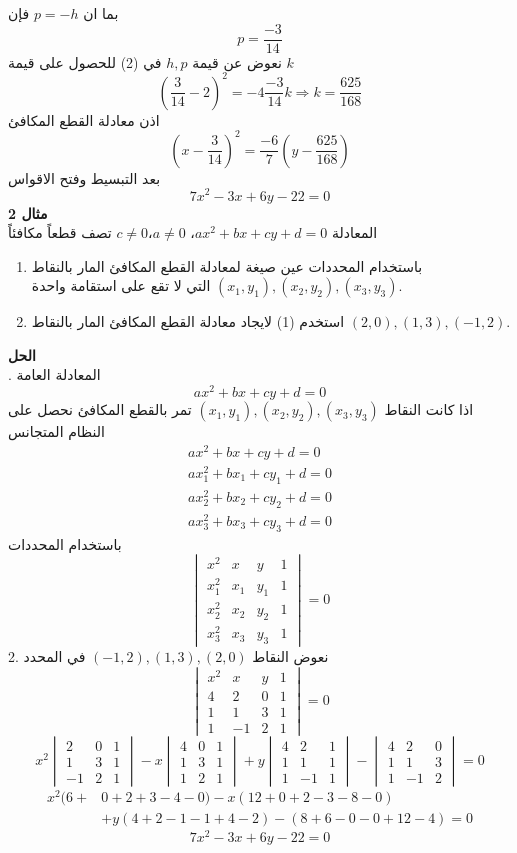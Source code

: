 بما ان $p = -h$ فإن 
\[
\boxed{p = \frac{-3}{14}}
\]
نعوض عن قيمة $h,p$ في (2) للحصول على قيمة $k$
\[
\left(\frac{3}{14} - 2\right)^2 = - 4 \frac{-3}{14} k \Rightarrow \boxed{k = \frac{625}{168}}
\]
اذن معادلة القطع المكافئ
\[
\left(x- \frac{3}{14}\right)^2 = \frac{-6}{7} \left(y - \frac{625}{168}\right)
\]
بعد التبسيط وفتح الاقواس
\[
7x^2 - 3x + 6y - 22=0
\]
\noindent
\textbf{مثال 2}\\
\noindent
المعادلة $ax^2+bx+cy+d=0$، $a\neq0$،$c\neq0$ تصف قطعاً مكافئاً
\begin{enumerate}	
	\item باستخدام المحددات عين صيغة لمعادلة القطع المكافئ المار بالنقاط $(x_1, y_1) , (x_2, y_2) , (x_3, y_3)$ التي لا تقع على استقامة واحدة.
	\item استخدم (1) لايجاد معادلة القطع المكافئ المار بالنقاط 
	$(2, 0), (1, 3), (-1,2)$.
\end{enumerate} 

\noindent
\textbf{الحل}\\
. المعادلة العامة 
\[
ax^2+bx+cy+d=0
\]
اذا كانت النقاط $(x_1,y_1),(x_2,y_2),(x_3,y_3)$ تمر بالقطع المكافئ نحصل على النظام المتجانس
\begin{align*}
	ax^2+bx+cy+d=0\\
	ax_1^2+bx_1+cy_1+d=0\\
	ax_2^2+bx_2+cy_2+d=0\\
	ax_3^2+bx_3+cy_3+d=0
\end{align*}
باستخدام المحددات
\[
\begin{vmatrix}
	x^2  & x & y & 1\\
	x_1^2  & x_1 & y_1 & 1\\
	x_2^2  & x_2 & y_2 & 1\\
	x_3^2  & x_3 & y_3 & 1
\end{vmatrix} = 0
\]
2. نعوض النقاط 
$(-1,2), (1,3), (2,0)$
في المحدد
\[
\begin{vmatrix}
	x^2 & x& y& 1\\
	4 & 2 & 0 & 1\\
	1 & 1& 3 & 1\\
	1 & -1 & 2&1
\end{vmatrix} = 0
\]
\[
x^2\begin{vmatrix}
	2 & 0&1\\
	1&3&1\\
	-1&2&1
\end{vmatrix}
-x \begin{vmatrix}
	4&0&1\\
	1&3&1\\
	1&2&1
\end{vmatrix}
+ y\begin{vmatrix}
	4&2&1\\
	1&1&1\\
	1&-1&1
\end{vmatrix}
-\begin{vmatrix}
	4&2&0\\
	1&1&3\\
	1&-1&2
\end{vmatrix} = 0
\]
\begin{align*}
	x^2(6+&0+2+3-4-0) - x(12+0+2-3-8-0)\\
	&+ y (4+2-1-1+4-2) - (8+6-0-0+12-4) = 0
\end{align*}
\[
7x^2 - 3x + 6y - 22=0
\]